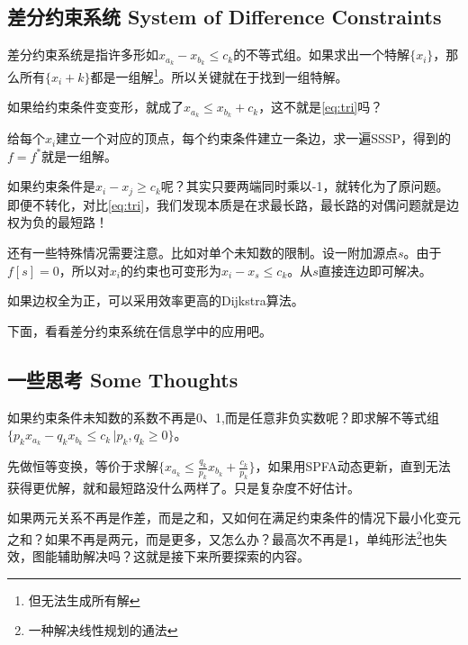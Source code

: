 \subsection{差分约束系统 System of Difference Constraints}
差分约束系统是指许多形如$x_{a_k} - x_{b_k} \leq c_k$的不等式组。如果求出一个特解$\{x_i\}$，那么所有$\{x_i + k\}$都是一组解\footnote{但无法生成所有解}。所以关键就在于找到一组特解。\par
如果给约束条件变变形，就成了$x_{a_k} \leq x_{b_k} + c_k$，这不就是\eqref{eq:tri}吗？
\par 给每个$x_i$建立一个对应的顶点，每个约束条件建立一条边，求一遍SSSP，得到的$f = f^*$就是一组解。\par
如果约束条件是$x_i - x_j \geq c_k$呢？其实只要两端同时乘以-1，就转化为了原问题。即便不转化，对比\eqref{eq:tri}，我们发现本质是在求最长路，最长路的对偶问题就是边权为负的最短路！\par
还有一些特殊情况需要注意。比如对单个未知数的限制。设一附加源点$s$。由于$f[s] = 0$，所以对$x_i$的约束也可变形为$x_i - x_s \leq c_k$。从$s$直接连边即可解决。
\par 如果边权全为正，可以采用效率更高的Dijkstra算法。
\par 下面，看看差分约束系统在信息学中的应用吧。



\subsection{一些思考 Some Thoughts}
如果约束条件未知数的系数不再是0、1,而是任意非负实数呢？即求解不等式组$\{p_k x_{a_k} - q_k x_{b_k} \leq c_k \, | p_k,q_k \ge 0\}$。\par
先做恒等变换，等价于求解$\{x_{a_k} \leq \frac{q_k}{p_k}x_{b_k} + \frac{c_k}{p_k}\}$，如果用SPFA动态更新，直到无法获得更优解，就和最短路没什么两样了。只是复杂度不好估计。\par
如果两元关系不再是作差，而是之和，又如何在满足约束条件的情况下最小化变元之和？如果不再是两元，而是更多，又怎么办？最高次不再是1，单纯形法\footnote{一种解决线性规划的通法}也失效，图能辅助解决吗？这就是接下来所要探索的内容。
